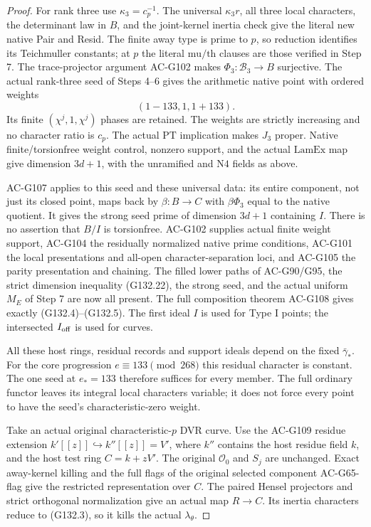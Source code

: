 \begin{proof}
For rank three use \(\kappa_3=c_p^{-1}\).
The universal \(\kappa_3r\), all three local characters,
the determinant law in \(B\), and the joint-kernel
inertia check give the literal new native Pair and Resid.
The finite away type is prime to \(p\), so reduction
identifies its Teichmuller constants; at \(p\) the
literal \(\mathrm{mu}/\mathrm{th}\) clauses are those
verified in Step 7.
The trace-projector argument AC-G102 makes
\(\Phi_3:\mathcal B_3\to B\) surjective.
The actual rank-three seed of Steps 4--6 gives the
arithmetic native point with ordered weights
\[
                  (1-133,1,1+133).
 \tag{G132.24}
\]
Its finite \((\chi^j,1,\chi^j)\) phases are retained.
The weights are strictly increasing and no character
ratio is \(c_p\).  The actual \(\mathrm{PT}\) implication
makes \(J_3\) proper.  Native finite/torsionfree weight
control, nonzero support, and the actual \(\mathrm{LamEx}\)
map give dimension \(3d+1\), with the unramified and
\(\mathrm{N4}\) fields as above.

AC-G107 applies to this seed and these universal data:
its entire component, not just its closed point, maps
back by \(\beta:B\to C\) with \(\beta\Phi_3\) equal to
the native quotient.  It gives the strong seed prime
of dimension \(3d+1\) containing \(I\).
There is no assertion that \(B/I\) is torsionfree.
AC-G102 supplies actual finite weight support, AC-G104
the residually normalized native prime conditions,
AC-G101 the local presentations and all-open
character-separation loci, and AC-G105 the parity
presentation and chaining.
The filled lower paths of AC-G90/G95, the strict
dimension inequality (G132.22), the strong seed, and
the actual uniform \(M_E\) of Step 7 are now all present.
The full composition theorem AC-G108 gives exactly
(G132.4)--(G132.5).
The first ideal \(I\) is used for Type I points;
the intersected \(I_{\rm off}\) is used for curves.

All these host rings, residual records and support
ideals depend on the fixed \(\bar\gamma_*\).
For the core progression \(e\equiv133\pmod{268}\)
this residual character is constant.  The one seed at
\(e_*=133\) therefore suffices for every member.
The full ordinary functor leaves its integral local
characters variable; it does not force every point
to have the seed's characteristic-zero weight.

Take an actual original characteristic-\(p\) DVR curve.
Use the AC-G109 residue extension
\(k'[[z]]\hookrightarrow k''[[z]]=V'\), where \(k''\)
contains the host residue field \(k\), and the host
test ring \(C=k+zV'\).
The original \(\mathcal O_0\) and \(S_j\) are unchanged.
Exact away-kernel killing and the full flags of the
original selected component AC-G65-flag give the
restricted representation over \(C\).
The paired Hensel projectors and strict orthogonal
normalization give an actual map \(R\to C\).
Its inertia characters reduce to (G132.3), so it kills
the actual \(\lambda_\theta\).


\end{proof}
